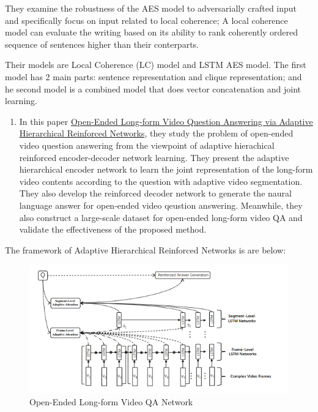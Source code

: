 \documentclass[]{book}
\providecommand{\tightlist}{%
  \setlength{\itemsep}{0pt}\setlength{\parskip}{0pt}}
\theoremstyle{definition}
\theoremstyle{definition}
\theoremstyle{definition}
\theoremstyle{remark}
\begin{document}
They examine the robustness of the AES model to adversarially crafted
input and specifically focus on input related to local coherence; A
local coherence model can evaluate the writing based on its ability to
rank coherently ordered sequence of sentences higher than their
conterparts.

Their models are Local Coherence (LC) model and LSTM AES model. The
first model has 2 main parts: sentence representation and clique
representation; and he second model is a combined model that does vector
concatenation and joint learning.

\begin{enumerate}
\def\labelenumi{\arabic{enumi}.}
\setcounter{enumi}{1}
\tightlist
\item
  In this paper
  \href{https://www.ijcai.org/proceedings/2018/0512.pdf}{Open-Ended
  Long-form Video Question Answering via Adaptive Hierarchical
  Reinforced Networks}, they study the problem of open-ended video
  question answering from the viewpoint of adaptive hierachical
  reinforced encoder-decoder network learning. They present the adaptive
  hierarchical encoder network to learn the joint representation of the
  long-form video contents according to the question with adaptive video
  segmentation. They also develop the reinforced decoder network to
  generate the naural language answer for open-ended video qeustion
  answering. Meanwhile, they also construct a large-scale dataset for
  open-ended long-form video QA and validate the effectiveness of the
  proposed method.
\end{enumerate}

The framework of Adaptive Hierarchical Reinforced Networks is are below:

\begin{figure}
\centering
\includegraphics{img/oe.png}
\caption{Open-Ended Long-form Video QA Network}
\end{figure}
\end{document}
